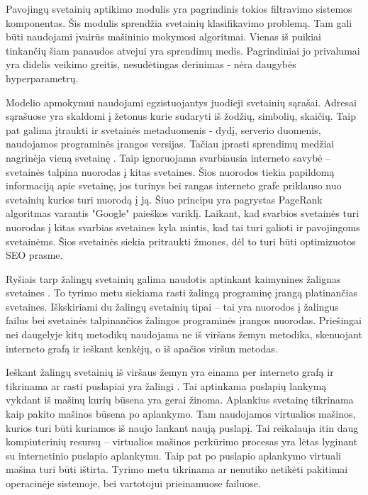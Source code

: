 Pavojingų svetainių aptikimo modulis yra pagrindinis tokios filtravimo sistemos komponentas.
Šis modulis sprendžia svetainių klasifikavimo problemą. Tam gali būti naudojami įvairūs mašininio mokymosi algoritmai.
Vienas iš puikiai tinkančių šiam panaudos atvejui \cite{trees} yra sprendimų medis.
Pagrindiniai jo privalumai yra didelis veikimo greitis, nesudėtingas derinimas - nėra daugybės hyperparametrų.

Modelio apmokymui naudojami egzistuojantys juodieji svetainių sąrašai.
Adresai sąrašuose yra skaldomi į žetonus kurie sudaryti iš žodžių, simbolių, skaičių.
Taip pat galima įtraukti ir svetainės metaduomenis - dydį, serverio duomenis, naudojamos programinės įrangos versijas.
Tačiau įprasti sprendimų medžiai nagrinėja vieną svetainę \cite{trees}.
Taip ignoruojama svarbiausia interneto savybė -- svetainės talpina nuorodas į kitas svetaines.
Šios nuorodos tiekia papildomą informaciją apie svetainę,
jos turinys bei rangas interneto grafe priklauso nuo svetainių kurios turi nuorodą į ją.
Šiuo principu yra pagrystas PageRank algoritmas \cite{pagerank} varantis "Google" paieškos variklį.
Laikant, kad svarbios svetainės turi nuorodas į kitas svarbias svetaines kyla mintis,
kad tai turi galioti ir pavojingoms svetainėms.
Šios svetainės siekia pritraukti žmones, dėl to turi būti optimizuotos SEO prasme.



Ryšiais tarp žalingų svetainių galima naudotis aptinkant kaimynines žalignas svetaines \cite{webcop}.
To tyrimo metu siekiama rasti žalingą programinę įrangą platinančias svetaines. Iškskiriami du žalingų svetainių tipai --
tai yra nuorodos į žalingus failus bei svetainės talpinančios žalingos programinės įrangos nuorodas.
Priešingai nei daugelyje kitų metodikų naudojama ne iš viršaus žemyn metodika, skenuojant interneto grafą ir ieškant kenkėjų,
o iš apačios viršun metodas.

Ieškant žalingų svetainių iš viršaus žemyn yra einama per interneto grafą ir tikrinama ar rasti puslapiai yra žalingi \cite{webcop}.
Tai aptinkama puslapių lankymą vykdant iš mašinų kurių būsena yra gerai žinoma. Aplankius svetainę tikrinama kaip pakito
mašinos būsena po aplankymo. Tam naudojamos virtualios mašinos, kurios turi būti kuriamos iš naujo lankant naują puslapį.
Tai reikalauja itin daug kompiuterinių resursų -- virtualios mašinos perkūrimo procesas yra lėtas lyginant su
internetinio puslapio aplankymu. Taip pat po puslapio aplankymo virtuali mašina turi būti ištirta. Tyrimo metu tikrinama
ar nenutiko netikėti pakitimai operacinėje sistemoje, bei vartotojui prieinamuose failuose.

